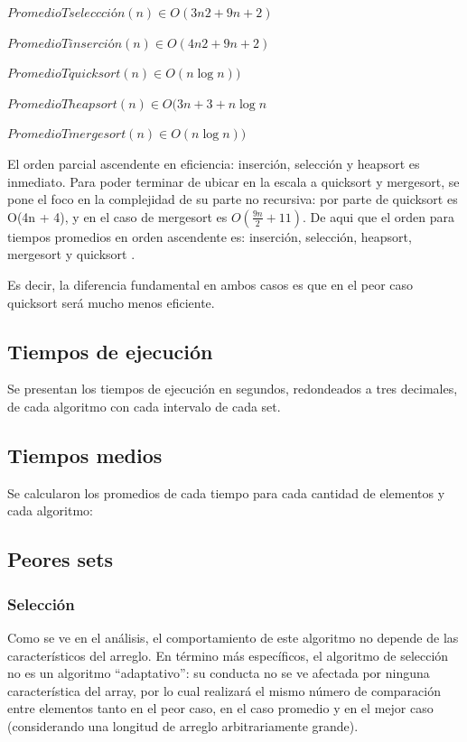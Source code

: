 \documentclass[article,a4paper]{article}
\begin{document}
$PromedioTseleccción(n)  \in O( 3n2 + 9n + 2)$

$PromedioTinserción(n) \in O(4n2 + 9n + 2) $

$PromedioTquicksort(n) \in O(n \log n))$

$PromedioTheapsort(n) \in O(3n + 3 +n \log n$ 

$PromedioTmergesort(n) \in O(n \log n))$

El orden parcial ascendente en eficiencia: inserción, selección y heapsort es inmediato. Para poder terminar de ubicar en la escala a quicksort y mergesort, se pone el foco en la complejidad de su parte no recursiva: por parte de quicksort es O(4n + 4), y en el caso de mergesort es $O( \frac{9n}{2} +11 )$. De aqui que el orden para tiempos promedios en orden ascendente es: inserción, selección, heapsort, mergesort y quicksort .

Es decir, la diferencia fundamental en ambos casos es que en el peor caso quicksort será mucho menos eficiente.

\subsection{Tiempos de ejecución}

Se presentan los tiempos de ejecución en segundos, redondeados a tres decimales, de cada algoritmo con cada intervalo de cada set.


\subsection{Tiempos medios}

Se calcularon los promedios de cada tiempo para cada cantidad de elementos y cada algoritmo:


\subsection{Peores sets}

\subsubsection{Selección}

Como se ve en el análisis, el comportamiento de este algoritmo no depende de las característicos del arreglo. En término más específicos, el algoritmo de selección no es un algoritmo “adaptativo”: su conducta no se ve afectada por ninguna característica del array, por lo cual realizará el mismo número de comparación entre elementos tanto en el peor caso, en el caso promedio y en el mejor caso (considerando una longitud de arreglo arbitrariamente grande).
\end{document}
